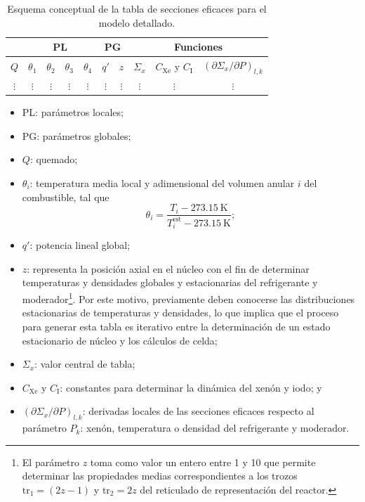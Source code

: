 \documentclass[11pt]{article}
\begin{document}
{
\begin{table}[h!]
\begin{center}
\begin{tabular}{|c|c|c|c|c|c|c|c|c|c|}
\hline
         & \multicolumn{4}{c|}{PL}                  & \multicolumn{2}{c|}{PG} & \multicolumn{3}{c|}{Funciones}\\
\hline
$Q$      & $\theta_{1}$ & $\theta_{2}$ & $\theta_{3}$ & $\theta_{4}$ & $q\prime$      & $z$      & $\Sigma_x$ & $C_{\text{Xe}}$ y $C_{\text{I}}$ & $\left( \partial\Sigma_x / \partial P \right)_{l,k}$\\
\hline
$\vdots$ & $\vdots$     & $\vdots$     & $\vdots$     & $\vdots$     & $\vdots$  & $\vdots$ & $\vdots$   & $\vdots$                         & $\vdots$\\
\hline
\end{tabular}
\caption{\label{table:modelo-detallado} Esquema conceptual de la tabla de secciones eficaces para el modelo detallado.}
\end{center}
\end{table}
}

\begin{itemize}
 \item PL: parámetros locales;
 \item PG: parámetros globales;
 \item $Q$: quemado;
 \item $\theta_i$: temperatura media local y adimensional del volumen anular $i$ del combustible, tal que
 \begin{equation*}
  \theta_i = \frac{T_i - \SI{273.15}{\kelvin}}{T^{\text{est}}_i - \SI{273.15}{\kelvin}};
 \end{equation*}
 \item $q\prime$: potencia lineal global;
 \item $z$: representa la posición axial en el núcleo con el fin de determinar temperaturas y densidades globales y estacionarias del refrigerante y moderador{\footnote{El parámetro $z$ toma como valor un entero entre \num{1} y \num{10} que permite determinar las propiedades medias correspondientes a los trozos $\text{tr}_1 = \left( 2z-1 \right)$ y $\text{tr}_2 = 2z$ del reticulado de representación del reactor.}}. Por este motivo, previamente deben conocerse las distribuciones estacionarias de temperaturas y densidades, lo que implica que el proceso para generar esta tabla es iterativo entre la determinación de un estado estacionario de núcleo y los cálculos de celda;
 \item $\Sigma_x$: valor central de tabla;
 \item $C_{\text{Xe}}$ y $C_{\text{I}}$: constantes para determinar la dinámica del xenón y iodo; y
 \item $\left( \partial\Sigma_x / \partial P \right)_{l,k}$: derivadas locales de las secciones eficaces respecto al parámetro $P_k$: xenón, temperatura o densidad del refrigerante y moderador.
\end{itemize}
\end{document}
